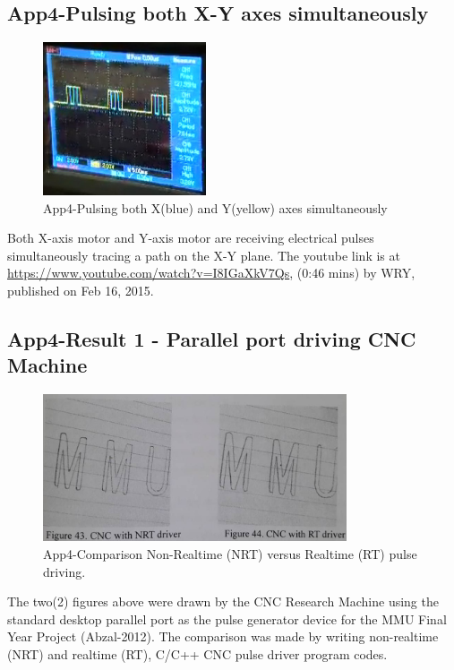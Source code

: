 \subsection{App4-Pulsing both X-Y axes simultaneously}

\begin{figure}[htbp]
	\begin{center}
		\includegraphics[width=0.43\textwidth]{./07-images/img-Ch4App/Pulsing-both-X-Y-axes-simultaneously.jpg}
		\caption{App4-Pulsing both X(blue) and Y(yellow) axes simultaneously}
		\label{fig:App4-Pulsing-both-X-Y-axes-simultaneously.jpg}
	\end{center}
\end{figure}
Both X-axis motor and Y-axis motor are receiving electrical pulses simultaneously tracing a path on the X-Y plane. The youtube link is at \url{https://www.youtube.com/watch?v=I8IGaXkV7Qs}, (0:46 mins) by WRY, published on Feb 16, 2015.

\pagebreak
\subsection{App4-Result 1 - Parallel port driving CNC Machine}

\begin{figure}[htbp]
	\begin{center}
		\includegraphics[width=0.80\textwidth]{./07-images/img-Ch4App/Abzal-CNC-NRT-versus-RT-Driven.jpg}
		\caption{App4-Comparison Non-Realtime (NRT) versus Realtime (RT) pulse driving.}
		\label{fig:App4-Abzal - CNC-NRT-versus-RT-Driven.jpg}
	\end{center}
\end{figure}
The two(2) figures above were drawn by the CNC Research Machine using the standard desktop parallel port as the pulse generator device for the MMU Final Year Project (Abzal-2012). The comparison was made by writing non-realtime (NRT) and realtime (RT), C/C++ CNC pulse driver program codes.

